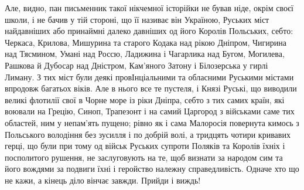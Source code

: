 Але, видно, пан письменник такої нікчемної історійки не бував ніде, окрім своєї
школи, і не бачив у тій стороні, що її називає він Україною, Руських міст
найдавніших або принаймні далеко давніших од його Королів Польських, себто:
Черкаса, Крилова, Мишурина та старого Кодака над рікою Дніпром, Чигирина над
Тясмином, Умані над Россю, Ладижина і Чагарлика над Бугом, Могилева, Рашкова й
Дубосар над Дністром, Кам'яного Затону і Білозерська у гирлі Лиману. З тих міст
були деякі провІнціальними та обласними Руськими містами впродовж багатьох
віків. Але в нього все те пустеля, і Князі Руські, що виводили великі флотилії
свої в Чорне море із ріки Дніпра, себто з тих самих країн, які воювали на
Грецію, Синоп, Трапезонт і на самий Царгород з військами саме тих областей, ним
у непам'ять пущено; рівно як і сама Малоросія повернута кимось з Польського
володіння без зусилля і по добрій волі, а тридцять чотири кривавих герці, що
були при тому од військ Руських супроти Поляків та Королів їхніх і посполитого
рушення, не заслуговують на те, щоб визнати за народом сим та його вождями за
подвиги їхні і геройство належну справедливість. Одначе хто що не кажи, а
кінець діло вінчає завжди. Прийди і виждь!
